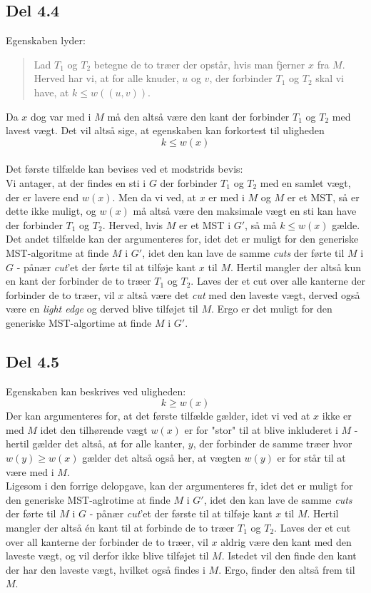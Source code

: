 \documentclass{report}
\begin{document}
\subsection*{Del 4.4}
Egenskaben lyder:
\begin{quote}
    Lad $T_1$ og $T_2$ betegne de to træer der opstår, hvis man fjerner $x$ fra $M$. Herved har vi, at for alle knuder, $u$ og $v$, der forbinder $T_1$ og $T_2$ skal vi have, at $k \leq w((u, v))$. 
\end{quote}
Da $x$ dog var med i $M$ må den altså være den kant der forbinder $T_1$ og $T_2$ med lavest vægt. Det vil altså sige, at egenskaben kan forkortest til uligheden 
$$k \leq w(x)$$ \\
Det første tilfælde kan bevises ved et modstrids bevis: \\
Vi antager, at der findes en sti i $G$ der forbinder $T_1$ og $T_2$ med en samlet vægt, der er lavere end $w(x)$. Men da vi ved, at $x$ er med i $M$ og $M$ er et MST, så er dette ikke muligt, og $w(x)$ må altså være den maksimale vægt en sti kan have der forbinder $T_1$ og $T_2$. Herved, hvis $M$ er et MST i $G'$, så må $k \leq w(x)$ gælde. \\
Det andet tilfælde kan der argumenteres for, idet det er muligt for den generiske MST-algoritme at finde $M$ i $G'$, idet den kan lave de samme \textit{cuts} der førte til $M$ i $G$ - pånær \textit{cut}'et der førte til at tilføje kant $x$ til $M$. Hertil mangler der altså kun en kant der forbinder de to træer $T_1$ og $T_2$. Laves der et cut over alle kanterne der forbinder de to træer, vil $x$ altså være det \textit{cut} med den laveste vægt, derved også være en \textit{light edge} og derved blive tilføjet til $M$. Ergo er det muligt for den generiske MST-algortime at finde $M$ i $G'$.

\newpage

\subsection*{Del 4.5}
Egenskaben kan beskrives ved uligheden:
$$k \geq w(x)$$
Der kan argumenteres for, at det første tilfælde gælder, idet vi ved at $x$ ikke er med $M$ idet den tilhørende vægt $w(x)$ er for "stor" til at blive inkluderet i $M$ - hertil gælder det altså, at for alle kanter, $y$, der forbinder de samme træer hvor $w(y) \geq w(x)$ gælder det altså også her, at vægten $w(y)$ er for står til at være med i $M$. \\
Ligesom i den forrige delopgave, kan der argumenteres fr, idet det er muligt for den generiske MST-aglrotime at finde $M$ i $G'$, idet den kan lave de samme \textit{cuts} der førte til $M$ i $G$ - pånær \textit{cut}'et der første til at tilføje kant $x$ til $M$. Hertil mangler der altså én kant til at forbinde de to træer $T_1$ og $T_2$. Laves der et cut over all kanterne der forbinder de to træer, vil $x$ aldrig være den kant med den laveste vægt, og vil derfor ikke blive tilføjet til $M$. Istedet vil den finde den kant der har den laveste vægt, hvilket også findes i $M$. Ergo, finder den altså frem til $M$.
\end{document}
